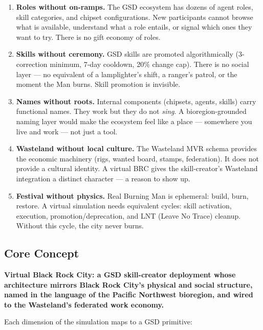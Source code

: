 \documentclass[11pt,letterpaper]{article}
\begin{document}
\begin{enumerate}
  \item \textbf{Roles without on-ramps.} The GSD ecosystem has dozens of agent roles, skill categories, and chipset configurations. New participants cannot browse what is available, understand what a role entails, or signal which ones they want to try. There is no gift economy of roles.
  \item \textbf{Skills without ceremony.} GSD skills are promoted algorithmically (3-correction minimum, 7-day cooldown, 20\% change cap). There is no social layer --- no equivalent of a lamplighter's shift, a ranger's patrol, or the moment the Man burns. Skill promotion is invisible.
  \item \textbf{Names without roots.} Internal components (chipsets, agents, skills) carry functional names. They work but they do not \emph{sing}. A bioregion-grounded naming layer would make the ecosystem feel like a place --- somewhere you live and work --- not just a tool.
  \item \textbf{Wasteland without local culture.} The Wasteland MVR schema provides the economic machinery (rigs, wanted board, stamps, federation). It does not provide a cultural identity. A virtual BRC gives the skill-creator's Wasteland integration a distinct character --- a reason to show up.
  \item \textbf{Festival without physics.} Real Burning Man is ephemeral: build, burn, restore. A virtual simulation needs equivalent cycles: skill activation, execution, promotion/deprecation, and LNT (Leave No Trace) cleanup. Without this cycle, the city never burns.
\end{enumerate}

\subsection{Core Concept}

\textbf{Virtual Black Rock City: a GSD skill-creator deployment whose architecture mirrors Black Rock City's physical and social structure, named in the language of the Pacific Northwest bioregion, and wired to the Wasteland's federated work economy.}

Each dimension of the simulation maps to a GSD primitive:
\end{document}
